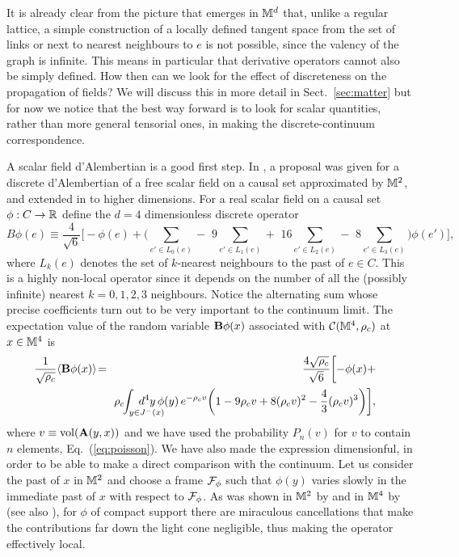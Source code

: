It is already clear from the picture that emerges in $\mathbb M^d$ that,  unlike a regular lattice,  a simple construction of  a locally defined tangent space
from the set of links or next to nearest neighbours to $e$ is not possible, since the valency of
the graph is infinite. This means in particular that derivative
operators cannot also be simply defined. 
How then can we look for the effect of discreteness on  the propagation of fields?  We will discuss this in more detail in Sect.~\ref{sec:matter} but for now we
notice that the best way forward is to look for scalar quantities, rather than more general tensorial ones,  in making the
discrete-continuum correspondence.  

A scalar field d'Alembertian is a good first step. In \cite{sorkinnonlocal,joereviewtwo}, a proposal was given for a discrete
d'Alembertian of a free
scalar field on a causal set approximated by $\mathbb M^2$, and extended in \cite{bd,dionthesis,dg} to higher
dimensions. For a real scalar field on  a causal set $\phi: C \rightarrow \mathbb R$ define the  $d=4$ dimensionless
discrete operator
\begin{equation} 
B\phi(e) \equiv \frac{4}{\sqrt{6}}\biggl[-\phi(e)  + \biggl( \sum_{e'\in L_0(e)}  - \, \,  9\!\!\!\!\sum_{e' \in L_1(e)}  + \, \, 16
\!\!\!\!\sum_{e'\in L_2(e)}   - \, \, 8 \!\!\!\!\sum_{e' \in L_3(e)} \biggr) \phi(e')\biggr],
\label{eq:disbk} 
\end{equation} 
where $L_k(e)$ denotes the set of $k$-nearest neighbours to the past  of $e \in C$. This is a highly non-local
operator since it depends on the number of all the (possibly infinite) nearest $k=0,1,2,3$ neighbours. Notice  
the alternating sum whose precise coefficients turn out to be very important to the continuum limit.  The expectation value of the  random variable $\mathbf B\phi(x)$  associated with $\mathcal C(\mathbb M^4,\rho_c)$ 
at  $x\in \mathbb M^4$ is  
\begin{eqnarray} 
  \!\!\!\!\!\frac{1}{\sqrt{\rc }}\av{\bB\phi(x)}\! &=& \!  \frac{4 \sqrt{\rc}}{\sqrt{6}}\biggl[-\phi(x)  + \nn \\
  && \!\! \rc \!\! \int_{y \in J^-(x)}\!\!\!\!\! \!\!\!\!\! \!\!\!\!\! d^4 y \, \phi(y) \, e^{-\rc
                                         v} \biggl(1-9\rc v + 8 (\rc v)^2 -\frac{4}{3} (\rc v)^3\biggr) \biggr],   
\end{eqnarray} 
where  $v\equiv \mathrm{vol}(\mathbf A(y,x))$ and we have used the probability $P_n(v) $ for $v$ to contain $n$ elements,
Eq.~(\ref{eq:poisson}). We have also made the expression dimensionful, in order to be able to make a direct comparison with the continuum. 
 Let us consider
the past of $x$ in $\mathbb M^2$ and choose a frame $\mathcal F_\phi$  such that $\phi(y)$ varies slowly in  the immediate past of  $x$
with respect to $\mathcal F_\phi$. 
As   was
shown in $\mathbb M^2$ by \cite{sorkinnonlocal} and in $\mathbb M^4$ by \cite{bd} (see also \citealt{dionthesis}),
for   $\phi$ of  compact
support  there are miraculous cancellations that make the contributions far down the light cone negligible, thus
making the operator effectively local. 

